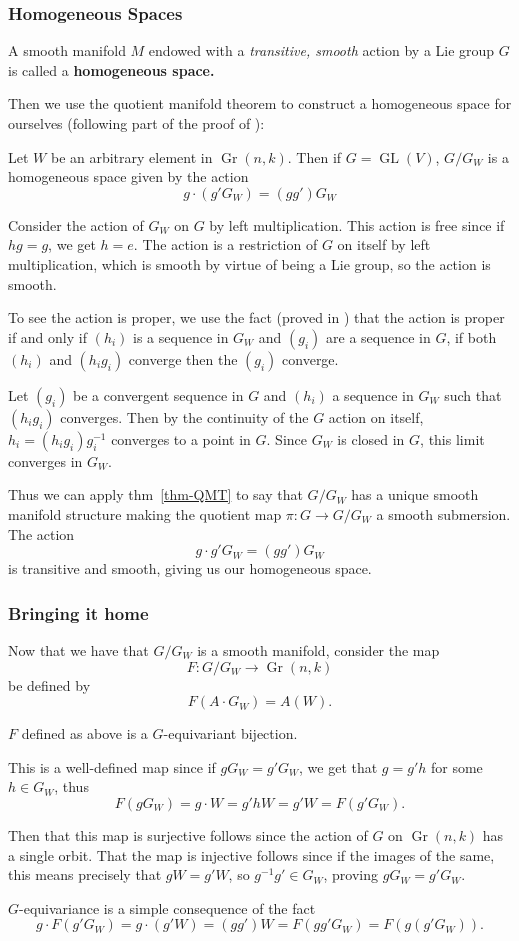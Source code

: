 \documentclass[12pt]{article}
\DeclareMathOperator{\Gr}{Gr}
\DeclareMathOperator{\GL}{GL}
\begin{document}
\subsubsection{Homogeneous Spaces}
\begin{defn}
	A smooth manifold $M$ endowed with a \textit{transitive, smooth} action by a Lie group $G$ is called
	a \textbf{homogeneous space.}
\end{defn}
Then we use the quotient manifold theorem to construct a homogeneous space for ourselves (following part of the proof of \cite[thm. 21.17]{LeeISM}):
\begin{prop}
	Let $W$ be an arbitrary element in $\Gr(n,k)$. Then if $G=\GL(V)$, $G/G_W$ is a homogeneous space given by the action
	\[g\cdot (g'G_W)=(gg')G_W\]
\end{prop}
\begin{prf}
	Consider the action of $G_W$ on $G$ by left multiplication. This action is free since if $hg=g$, we get $h=e$. The action is a restriction of 
	$G$ on itself by left multiplication, which is smooth by virtue of being a Lie group, so the action is smooth.

	To see the action is proper, we use the fact (proved in \cite[prop. 21.5(a,b)]{LeeISM}) that the action is proper if and only if $(h_i)$ is a sequence in $G_W$ and 
	$(g_i)$ are a sequence in $G$, if both $(h_i)$ and $(h_ig_i)$ converge then the $(g_i)$ converge.

	Let $(g_i)$ be a convergent sequence in $G$ and $(h_i)$ a sequence in $G_W$ such that $(h_ig_i)$ converges. Then by the continuity of 
	the $G$ action on itself, $h_i=(h_ig_i)g_i^{-1}$ converges to a point in $G$. Since $G_W$ is closed in $G$, this limit converges in $G_W$.

	Thus we can apply thm~\ref{thm-QMT} to say that $G/G_W$ has a unique smooth manifold structure making the quotient map $\pi:G\to G/G_W$ a smooth submersion. The action 
	\[g\cdot g'G_W=(gg')G_W\]
	is transitive and smooth, giving us our homogeneous space.
\end{prf}
\subsubsection{Bringing it home}
Now that we have that $G/G_W$ is a smooth manifold, consider the map
\[F:G/G_W\to \Gr(n,k)\]
be defined by 
\[F(A\cdot G_W)=A(W).\]

\begin{lem}
	$F$ defined as above is a $G$-equivariant bijection.
\end{lem}
\begin{prf}
	This is a well-defined map since if $gG_W=g'G_W$, we get that $g=g'h$ for some $h\in G_W$, thus
	\[F(gG_W)=g\cdot W=g'hW=g'W=F(g'G_W).\]

	Then that this map is surjective follows since the action of $G$ on $\Gr(n,k)$ has a single orbit. That 
	the map is injective follows since if the images of the same, this means precisely that $gW=g'W$, so $g^{-1}g'\in G_W$,
	proving $gG_W=g'G_W$.

	$G$-equivariance is a simple consequence of the fact 
	\[g\cdot F(g'G_W)=g\cdot (g'W)=(gg')W=F(gg'G_W)=F(g(g'G_W)).\]
\end{prf}
\end{document}
